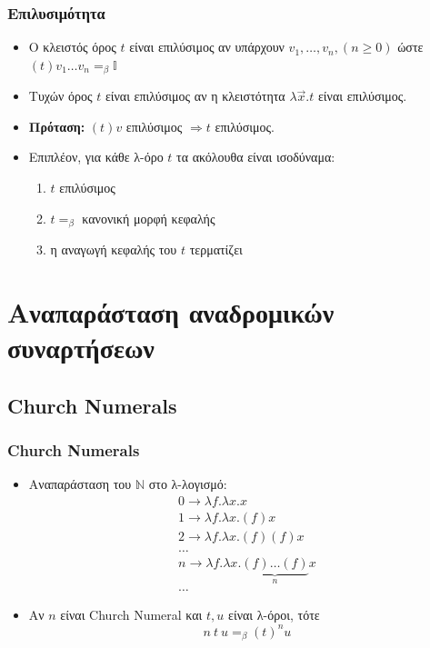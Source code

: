 \documentclass{beamer}
\begin{document}
\begin{frame}
\frametitle{Επιλυσιμότητα}
\begin{itemize}
\item Ο κλειστός όρος $t$ είναι επιλύσιμος αν υπάρχουν $v_1, \ldots, v_n, (n \geqslant 0)$ ώστε
 $ (t) v_1 \ldots v_n =_\beta \mathbb{I} $ \pause
 \item Τυχών όρος $t$ είναι επιλύσιμος αν η κλειστότητα $\lambda \overrightarrow{x} . t$ είναι επιλύσιμος. \pause
 \item \textbf{Πρόταση:} $(t) v$ επιλύσιμος $ \Rightarrow t$ επιλύσιμος. \pause
 \item Επιπλέον, για κάθε λ-όρο $t$ τα ακόλουθα είναι ισοδύναμα:
 	\begin{enumerate}
 	\item $t$ επιλύσιμος
 	\item $t =_\beta$ κανονική μορφή κεφαλής
 	\item η αναγωγή κεφαλής του $t$ τερματίζει 	
 	\end{enumerate}
\end{itemize}
\end{frame}

\section{Αναπαράσταση αναδρομικών συναρτήσεων}

\subsection{Church Numerals}

\begin{frame}
        \frametitle{Church Numerals}
        \begin{itemize}
                \item Αναπαράσταση του $ \mathbb{N} $ στο λ-λογισμό:
                \pause
	        	$$ \begin{array}{l}
	        		0 \rightarrow \lambda f . \lambda x . x \\
	        		1 \rightarrow \lambda f . \lambda x . (f) x \\
	        		2 \rightarrow \lambda f . \lambda x . (f) (f) x \\
	        		\ldots \\
	        		n \rightarrow \lambda f . \lambda x . \underbrace{(f) \ldots (f)}_n x \\
	        		\ldots
	        	\end{array} $$
	        	\pause
                \item Αν $n $ είναι Church Numeral και $t, u$ είναι λ-όροι, τότε
                $$ n\:t\:u =_\beta (t)^n u $$
        \end{itemize}
\end{frame}
\end{document}
